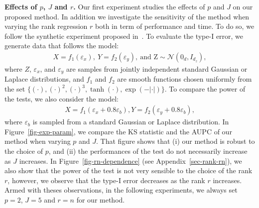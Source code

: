 \textbf{Effects of $p$, $J$ and $r$.} Our first experiment studies the effects of $p$ and $J$ on our proposed method. In addition we investigate the sensitivity of the method when varying the rank regression $r$ both in term of performance and time. To do so, we follow the synthetic experiment proposed in~\cite{strobl2019approximate}. To evaluate the type-I error, we generate data that follows the model:
\begin{align}
\label{exp-strobl-h0}
    X=f_1(\varepsilon_x), \ Y=f_2(\varepsilon_y),~\text{and Z}\sim\mathcal{N}(0_d,I_{d_z}),
\end{align}
where $Z$, $\varepsilon_x$, and $\varepsilon_y$ are samples from jointly independent standard Gaussian or Laplace distributions, and $f_1$ and $f_2$ are smooth
functions chosen uniformly from the set $\{(\cdot), (\cdot)^2, (\cdot)^3, \tanh(\cdot), \exp(-|\cdot|)\}$. To compare the power of the tests, we also consider the model:
\begin{align}
\label{exp-strobl-h1}
    X=f_1(\varepsilon_x +0.8\varepsilon_b), Y=f_2(\varepsilon_y+0.8\varepsilon_b),
\end{align}
where $\varepsilon_b$ is sampled from a standard Gaussian or Laplace distribution. In Figure~\ref{fig-exp-param}, we compare the KS statistic and the AUPC of our method when varying $p$ and $J$. That figure shows that (i) our method is robust to the choice of $p$, and (ii) the performances of the test do not necessarily increase as $J$ increases. In Figure~\ref{fig-rn-dependence} (see Appendix~\ref{sec-rank-rn}), we also show that the power of the test is not very sensible to the choice of the rank $r$, however, we observe that the type-I error decreases as the rank $r$ increases. Armed with theses observations, in the following experiments, we always set $p=2$, $J=5$ and $r=n$ for our method.


